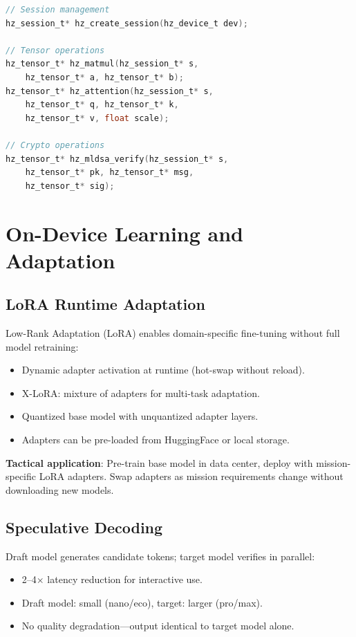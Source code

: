 \documentclass[11pt,letterpaper]{article}
\begin{document}
\begin{lstlisting}[language=C,caption={GPU kernel acceleration C API (excerpt).}]
// Session management
hz_session_t* hz_create_session(hz_device_t dev);

// Tensor operations
hz_tensor_t* hz_matmul(hz_session_t* s,
    hz_tensor_t* a, hz_tensor_t* b);
hz_tensor_t* hz_attention(hz_session_t* s,
    hz_tensor_t* q, hz_tensor_t* k,
    hz_tensor_t* v, float scale);

// Crypto operations
hz_tensor_t* hz_mldsa_verify(hz_session_t* s,
    hz_tensor_t* pk, hz_tensor_t* msg,
    hz_tensor_t* sig);
\end{lstlisting}

\section{On-Device Learning and Adaptation}

\subsection{LoRA Runtime Adaptation}

Low-Rank Adaptation (LoRA) enables domain-specific fine-tuning without full model retraining:

\begin{itemize}
\item Dynamic adapter activation at runtime (hot-swap without reload).
\item X-LoRA: mixture of adapters for multi-task adaptation.
\item Quantized base model with unquantized adapter layers.
\item Adapters can be pre-loaded from HuggingFace or local storage.
\end{itemize}

\textbf{Tactical application}: Pre-train base model in data center, deploy with mission-specific LoRA adapters. Swap adapters as mission requirements change without downloading new models.

\subsection{Speculative Decoding}

Draft model generates candidate tokens; target model verifies in parallel:
\begin{itemize}
\item 2--4$\times$ latency reduction for interactive use.
\item Draft model: small (nano/eco), target: larger (pro/max).
\item No quality degradation---output identical to target model alone.
\end{itemize}
\end{document}
